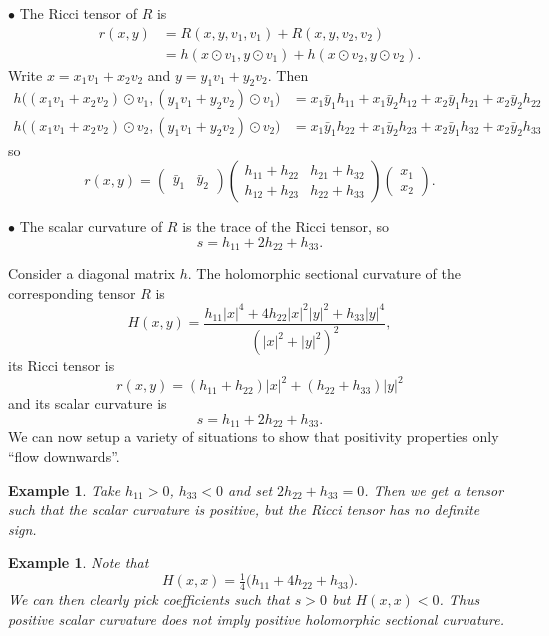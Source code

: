 \documentclass[11pt]{article}
\newtheorem{exam}[theo]{Example}
\begin{document}
\smallskip\noindent$\bullet$\quad
The Ricci tensor of $R$ is
\begin{align*}
  r(x,y)
  &= R(x,y,v_1,v_1) + R(x,y,v_2,v_2)
  \\
  &= h(x \odot v_1, y \odot v_1) + h(x \odot v_2, y \odot v_2).
\end{align*}
Write $x = x_1v_1 + x_2v_2$ and $y = y_1 v_1 + y_2v_2$. Then
\begin{align*}
h\bigl((x_1 v_1 + x_2v_2) \odot v_1, (y_1v_1 + y_2v_2) \odot v_1 \bigr)
&= x_1\bar y_1 h_{11} + x_1\bar y_2 h_{12} + x_2\bar y_1 h_{21} + x_2\bar y_2 h_{22}
\\
h\bigl((x_1 v_1 + x_2v_2) \odot v_2, (y_1v_1 + y_2v_2) \odot v_2 \bigr)
&= x_1\bar y_1 h_{22} + x_1\bar y_2 h_{23} + x_2\bar y_1 h_{32} + x_2\bar y_2 h_{33}
\end{align*}
so
$$
r(x,y)
= \begin{pmatrix}\bar y_1 & \bar y_2\end{pmatrix}
  \begin{pmatrix}
  h_{11} + h_{22}  & h_{21} + h_{32}
    \\
  h_{12} + h_{23} & h_{22} + h_{33}
  \end{pmatrix}
  \begin{pmatrix}x_1 \\ x_2 \end{pmatrix}.
$$


\smallskip\noindent$\bullet$\quad
The scalar curvature of $R$ is the trace of the Ricci tensor, so
$$
s = h_{11} + 2 h_{22} + h_{33}.
$$

\smallskip
Consider a diagonal matrix $h$. The holomorphic sectional curvature of the corresponding tensor $R$ is
$$
H(x,y)
= \frac{h_{11} |x|^4 + 4 h_{22} |x|^2|y|^2 + h_{33}|y|^4}{(|x|^2+|y|^2)^2},
$$
its Ricci tensor is
$$
r(x,y) = (h_{11} + h_{22})|x|^2 + (h_{22} + h_{33})|y|^2
$$
and its scalar curvature is
$$
s = h_{11} + 2h_{22} + h_{33}.
$$
We can now setup a variety of situations to show that positivity properties only ``flow downwards''.

\begin{exam}
Take $h_{11} > 0$, $h_{33} < 0$ and set $2h_{22} + h_{33} = 0$. Then we get a tensor such that the scalar curvature is positive, but the Ricci tensor has no definite sign.
\end{exam}

\begin{exam}
Note that
$$
H(x,x) = \tfrac 14 \bigl(h_{11} + 4h_{22} + h_{33} \bigr).
$$
We can then clearly pick coefficients such that $s > 0$ but $H(x,x) < 0$. Thus positive scalar curvature does not imply positive holomorphic sectional curvature.
\end{exam}
\end{document}
